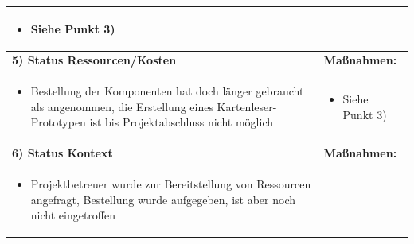 \begin{center}
\begin{scriptsize}
\begin{tabularx}{\textwidth}{|p{8cm}|X|}
\begin{minipage}{.4\textwidth}
    \begin{flushleft}
        \begin{itemize} \vspace{-1.9cm}  
         \item Siehe Punkt 3)
         \vspace{0.2cm}
    \end{itemize}
    \end{flushleft}
    \end{minipage} \\
    \hline
    \textbf{5) Status Ressourcen/Kosten} & \textbf{Maßnahmen:}\\
    \begin{minipage}{.56\textwidth} 
    \begin{flushleft}
        \begin{itemize} \vspace{0cm}  
         \item Bestellung der Komponenten hat doch länger gebraucht als angenommen, die Erstellung  eines Kartenleser-Prototypen ist bis Projektabschluss nicht möglich
         \vspace{0.2cm}
    \end{itemize}
    \end{flushleft}
    \end{minipage} &
    \begin{minipage}{.4\textwidth} 
    \begin{flushleft}
        \begin{itemize} \vspace{-0.6cm}  
         \item Siehe Punkt 3)
         \vspace{0.2cm}
    \end{itemize}
    \end{flushleft}
    \end{minipage} \\
    \hline
    \textbf{6) Status Kontext} & \textbf{Maßnahmen:}\\
    \begin{minipage}{.555\textwidth} 
    \begin{flushleft}
        \begin{itemize} \vspace{0cm}  
            \item Projektbetreuer wurde zur Bereitstellung von Ressourcen angefragt, Bestellung wurde aufgegeben, ist aber noch nicht eingetroffen
            \vspace{0.2cm}

\end{itemize}
\end{flushleft}
\end{minipage}
\end{tabularx}
\end{scriptsize}
\end{center}

